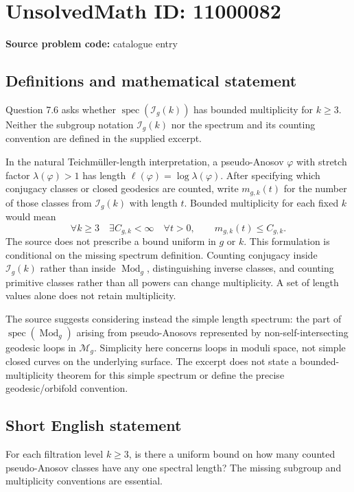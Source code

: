 \documentclass[11pt]{article}
\begin{document}
\section*{UnsolvedMath ID: 11000082}
\textbf{Source problem code:} catalogue entry
\subsection{Definitions and mathematical statement}
Question 7.6 asks whether $\operatorname{spec}(\mathcal I_g(k))$ has bounded multiplicity for $k\geq3$. Neither the subgroup notation $\mathcal I_g(k)$ nor the spectrum and its counting convention are defined in the supplied excerpt.

In the natural Teichm\"uller-length interpretation, a pseudo-Anosov $\varphi$ with stretch factor $\lambda(\varphi)>1$ has length $\ell(\varphi)=\log\lambda(\varphi)$. After specifying which conjugacy classes or closed geodesics are counted, write $m_{g,k}(t)$ for the number of those classes from $\mathcal I_g(k)$ with length $t$. Bounded multiplicity for each fixed $k$ would mean
\[
 \forall k\geq3\quad\exists C_{g,k}<\infty\quad
 \forall t>0,\qquad m_{g,k}(t)\leq C_{g,k}.
\]
The source does not prescribe a bound uniform in $g$ or $k$. This formulation is conditional on the missing spectrum definition. Counting conjugacy inside $\mathcal I_g(k)$ rather than inside $\operatorname{Mod}_g$, distinguishing inverse classes, and counting primitive classes rather than all powers can change multiplicity. A set of length values alone does not retain multiplicity.

The source suggests considering instead the simple length spectrum: the part of $\operatorname{spec}(\operatorname{Mod}_g)$ arising from pseudo-Anosovs represented by non-self-intersecting geodesic loops in $\mathcal M_g$. Simplicity here concerns loops in moduli space, not simple closed curves on the underlying surface. The excerpt does not state a bounded-multiplicity theorem for this simple spectrum or define the precise geodesic/orbifold convention.
\subsection{Short English statement}
For each filtration level $k\geq3$, is there a uniform bound on how many counted pseudo-Anosov classes have any one spectral length? The missing subgroup and multiplicity conventions are essential.
\end{document}
